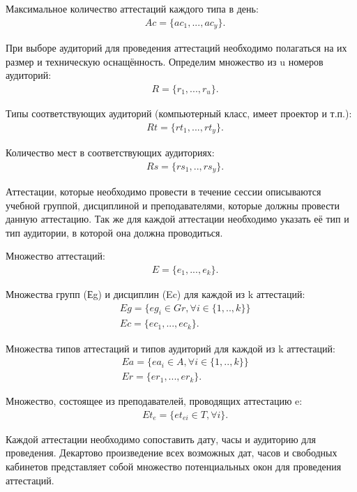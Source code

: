 Максимальное количество аттестаций каждого типа в день:
\begin{align}
	& Ac =  \{ac_1,...,ac_y\}.
\end{align}

При выборе аудиторий для проведения аттестаций необходимо полагаться на их размер и техническую оснащённость. Определим множество из u номеров аудиторий:
\begin{align}
	& R =  \{r_1,...,r_u\}.
\end{align}

Типы соответствующих аудиторий (компьютерный класс, имеет проектор и т.п.):
\begin{align}
	& Rt =  \{rt_1,...,rt_y\}.
\end{align}

Количество мест в соответствующих аудиториях:
\begin{align}
	& Rs =  \{rs_1,..,rs_y\} .
\end{align}

Аттестации, которые необходимо провести в течение сессии описываются учебной группой, дисциплиной и преподавателями, которые должны провести данную аттестацию. Так же для каждой аттестации необходимо указать её тип и тип аудитории, в которой она должна проводиться.

Множество аттестаций:
\begin{align}
	& {E} =  \{ e_1,...,e_k\}.
\end{align}

Множества групп (Еg) и дисциплин (Ec) для каждой из k аттестаций:
\begin{align}
	& Eg =  \{ eg_i\in{}Gr , \forall  i \in{} \{1,..,k\} \} \\ 
	& {Ec} =  \{ ec_1,...,ec_k\}.
\end{align}

Множества типов аттестаций и типов аудиторий для каждой из k аттестаций:
\begin{align}
	& Ea =  \{ ea_i\in{}A , \forall  i \in{} \{1,..,k\} \} \\ 
	& Er =  \{ er_1,...,er_k\}.
\end{align}

Множество, состоящее из преподавателей, проводящих аттестацию e:
\begin{align}
	& Et_e =  \{ et_{ei}\in{}T , \forall  i \}.
\end{align}

Каждой аттестации необходимо сопоставить дату, часы и аудиторию для проведения. Декартово произведение всех возможных дат, часов и свободных кабинетов представляет собой множество потенциальных окон для проведения аттестаций.

